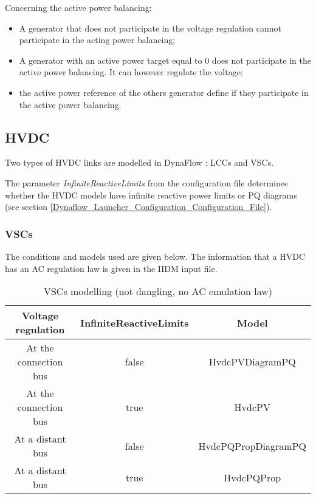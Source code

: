 \documentclass[a4paper, 12pt]{report}
\begin{document}
\par Concerning the active power balancing:

\begin{itemize}
  \item A generator that does not participate in the voltage regulation cannot participate in the acting power balancing;
  \item A generator with an active power target equal to 0 does not participate in the active power balancing. It can however regulate the voltage;
  \item the active power reference of the others generator define if they participate in the active power balancing.
\end{itemize}

\subsection{HVDC}

Two types of HVDC links are modelled in DynaFlow : LCCs and VSCs.

The parameter \textit{InfiniteReactiveLimits} from the configuration file determines whether the HVDC models have infinite reactive power limits
or PQ diagrams (see section \ref{Dynaflow_Launcher_Configuration_Configuration_File}).

\subsubsection{VSCs}

The conditions and models used are given below.
The information that a HVDC has an AC regulation law is given in the IIDM input file.\\

\begin{table}[ht!]
\center
\begin{tabular}{ c | c | c}
\toprule
\small{\textbf{{Voltage regulation}}}& \small{\textbf{{InfiniteReactiveLimits}}} & \small{\textbf{{Model}}} \\
\midrule
\rowcolor{gray!10}
 \small{At the connection bus} & \small{false}& \small{HvdcPVDiagramPQ} \\
\rowcolor{white}
 \small{At the connection bus} & \small{true}& \small{HvdcPV} \\
\rowcolor{gray!10}
 \small{At a distant bus} & \small{false} & \small{HvdcPQPropDiagramPQ} \\
\rowcolor{white}
 \small{At a distant bus} & \small{true} & \small{HvdcPQProp} \\
\bottomrule
\end{tabular}
\caption{VSCs modelling (not dangling, no AC emulation law)}
\end{table}
\end{document}
